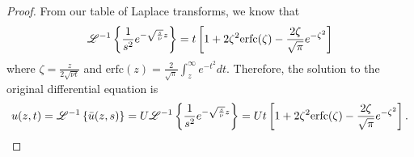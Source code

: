 \begin{proof}
  From our table of Laplace transforms, we know that
  \begin{align*}
    \mathscr{L}^{-1}\left\{ {\frac{1}{s^2}e^{-\sqrt{\frac{s}{\nu}}z}} \right\} = t\left[1 + 2 \zeta^2 \text{erfc}(\zeta) - \frac{2\zeta}{\sqrt{\pi}}e^{-\zeta^2}\right]
  \end{align*}
  where $\zeta = \frac{z}{2\sqrt{\nu t}}$ and $\displaystyle \text{erfc}(z) = \frac{2}{\sqrt{\pi}}\int_z^\infty e^{-t^2} dt$.
  Therefore, the solution to the original differential equation is
  \begin{align*}
    u(z, t) = \mathscr{L}^{-1}\left\{ {\bar{u}(z, s)} \right\} = U\mathscr{L}^{-1}\left\{ {\frac{1}{s^2}e^{-\sqrt{\frac{s}{\nu}}z}} \right\} = Ut\left[1 + 2 \zeta^2 \text{erfc}(\zeta) - \frac{2\zeta}{\sqrt{\pi}}e^{-\zeta^2}\right].
  \end{align*}
\end{proof}
\newpage
